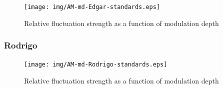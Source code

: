 \documentclass[a4paper]{article}
\begin{document}
\begin{figure}[H]
  \centering
  \texttt{[image: img/AM-md-Edgar-standards.eps]}
  \caption{Relative fluctuation strength as a function of modulation depth}
\label{fig:md-edgar}
\end{figure}

\subsubsection{Rodrigo}

\begin{figure}[H]
  \centering
  \texttt{[image: img/AM-md-Rodrigo-standards.eps]}
  \caption{Relative fluctuation strength as a function of modulation depth}
\label{fig:md-rodrigo}
\end{figure}
\end{document}
